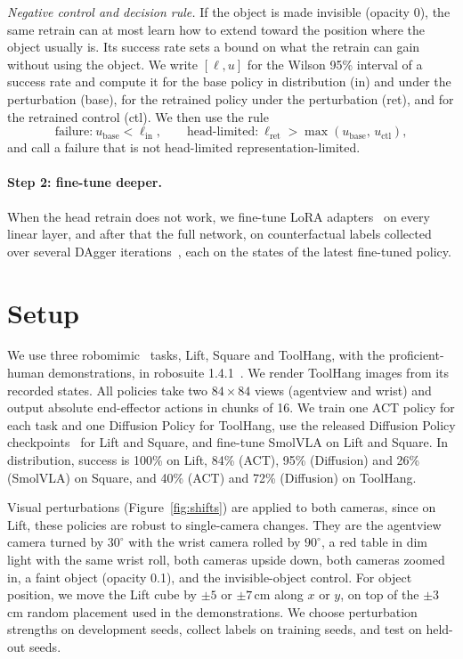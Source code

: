 \documentclass[10pt]{article}
\begin{document}
\emph{Negative control and decision rule.} If the object is made invisible (opacity 0), the same
retrain can at most learn how to extend toward the position where the object usually is. Its success
rate sets a bound on what the retrain can gain without using the object. We write $[\ell, u]$ for the Wilson 95\%
interval of a success rate and compute it for the base policy in distribution (in) and under the
perturbation (base), for the retrained policy under the perturbation (ret), and for the retrained
control (ctl). We then use the rule
\begin{equation}
\text{failure:}\ u_\text{base} < \ell_\text{in}, \qquad
\text{head-limited:}\ \ell_\text{ret} > \max(u_\text{base},\, u_\text{ctl}),
\label{eq:rule}
\end{equation}
and call a failure that is not head-limited representation-limited.

\paragraph{Step 2: fine-tune deeper.} When the head retrain does not work, we fine-tune LoRA
adapters~\citep{hu2022lora} on every linear layer, and after that the full network, on counterfactual labels collected over
several DAgger iterations~\citep{ross2011dagger}, each on the states of the latest fine-tuned policy.

\section{Setup}
\label{sec:setup}
We use three robomimic~\citep{mandlekar2021robomimic} tasks, Lift, Square and ToolHang, with the
proficient-human demonstrations, in robosuite 1.4.1~\citep{zhu2020robosuite}. We render ToolHang
images from its recorded states. All policies take two $84\times84$ views
(agentview and wrist) and output absolute end-effector actions in chunks of 16. We train one ACT policy
for each task and one Diffusion Policy for ToolHang, use the released Diffusion Policy checkpoints~\citep{chi2023diffusion} for Lift and Square, and fine-tune SmolVLA on Lift and Square. In
distribution, success is 100\% on Lift, 84\% (ACT), 95\% (Diffusion) and 26\% (SmolVLA) on Square, and 40\% (ACT) and 72\% (Diffusion) on ToolHang.

Visual perturbations (Figure~\ref{fig:shifts}) are applied to both cameras, since on Lift, these
policies are robust to single-camera changes. They are the agentview camera turned by $30^\circ$ with the wrist
camera rolled by $90^\circ$, a red table in dim light with the same wrist roll, both cameras upside down,
both cameras zoomed in, a faint object (opacity 0.1), and the invisible-object control. For object
position, we move the Lift cube by $\pm5$ or $\pm7$\,cm along $x$ or $y$, on top of the $\pm3$\,cm
random placement used in the demonstrations. We choose perturbation strengths on development seeds, collect
labels on training seeds, and test on held-out seeds.
\end{document}
